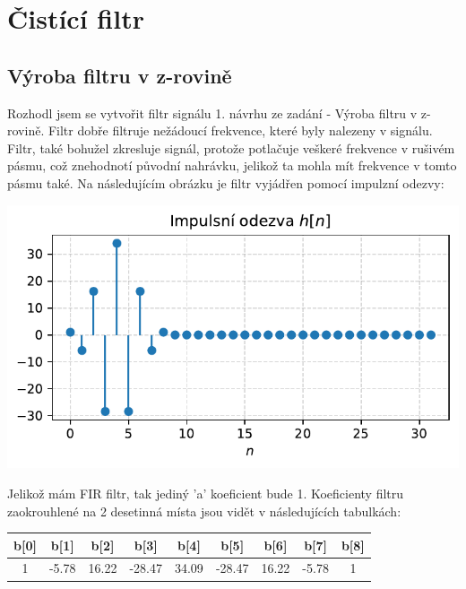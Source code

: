 \documentclass[a4paper, 11pt]{article}
\begin{document}


\newpage
\section{Čistící filtr}
\subsection{Výroba filtru v z-rovině}
Rozhodl jsem se vytvořit filtr signálu 1. návrhu ze zadání - Výroba filtru v z-rovině. Filtr dobře filtruje nežádoucí frekvence, které byly nalezeny v signálu. Filtr, také bohužel zkresluje signál, protože potlačuje veškeré frekvence v rušivém pásmu, což znehodnotí původní nahrávku, jelikož ta mohla mít frekvence v tomto pásmu také. Na následujícím obrázku je filtr vyjádřen pomocí impulzní odezvy:

\begin{center}
        \includegraphics[scale=0.7]{img/5_filter_impuls.pdf} \\
\end{center}


Jelikož mám FIR filtr, tak jediný 'a' koeficient bude 1.  Koeficienty filtru zaokrouhlené na 2 desetinná místa jsou vidět v následujících tabulkách:

%

\begin{table}[ht]
    \centering
    \begin{tabular}{| c | c | c | c | c | c | c |  c |  c |}
    \hline
        b[0] & b[1] & b[2] & b[3] & b[4] & b[5] & b[6] & b[7] & b[8]  \\ \hline
        1 & -5.78  & 16.22 & -28.47 & 34.09 & -28.47 & 16.22 & -5.78 & 1   \\ \hline
    \end{tabular}
\end{table}
\end{document}
